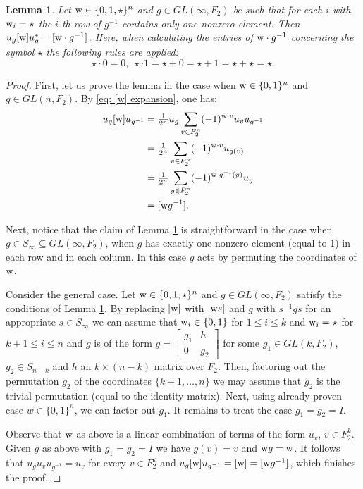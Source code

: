 \documentclass[11pt]{amsart}
\newcommand{\ie}{\text{i.e.\;}}
\theoremstyle{plain}
\newtheorem{lemma}[theorem]{Lemma}
\theoremstyle{definition}
\theoremstyle{remark}
\numberwithin{equation}{section}
\begin{document}
\begin{lemma}\label{lemma: g[w]/g}
	Let ${\rm w}\in\{0,1,\star\}^n$ and $g\in GL(\infty,F_2)$ be such that for each $i$ with ${\rm w}_i=\star$ the $i$-th row of $g^{-1}$ contains only one nonzero element. Then $u_g[{\rm w}]u_g^*=[{\rm w}\cdot g^{-1}]$.  Here, when calculating the entries of ${\rm w}\cdot g^{-1}$ concerning the symbol $\star$ the following rules are applied: $$\star\cdot 0=0,\;\star\cdot 1=\star+0=\star+1=\star+\star=\star.$$
\end{lemma} 
\begin{proof}
	First, let us prove the lemma in the case when ${\rm w}\in\{0,1\}^n$ and $g\in GL(n,F_2)$. By \eqref{eq: [w] expansion}, one has:
	\begin{align*}
		u_g[{\rm w}]u_{g^{-1}}&=\tfrac{1}{2^n}u_g\sum\limits_{v\in F_2^n}(-1)^{{\rm w}\cdot v}u_vu_{g^{-1}}\\&=\tfrac{1}{2^n}\sum\limits_{v\in F_2^n}(-1)^{{\rm w}\cdot v}u_{g(v)}\\&=\tfrac{1}{2^n}\sum\limits_{y\in F_2^n}(-1)^{{\rm w}\cdot g^{-1}(y)}u_y\\&=[{\rm w}g^{-1}].
	\end{align*}
	
	Next, notice that the claim of Lemma \ref{lemma: g[w]/g} is straightforward in the case when $g\in S_\infty\subseteq GL(\infty,F_2)$, \ie when $g$ has exactly one nonzero element (equal to 1) in each row and in each column. In this case $g$ acts by permuting the coordinates of ${\rm w}$.  
	
	Consider the general case. Let ${\rm w}\in\{0,1,\star\}^n$ and $g\in GL(\infty,F_2)$ satisfy the conditions of Lemma \ref{lemma: g[w]/g}. By replacing $[{\rm w}]$ with $[{\rm w}s]$ and $g$ with $s^{-1}gs$ for an appropriate $s\in S_\infty$ we can assume that ${\rm w}_i\in \{0,1\}$ for $1\leqslant i\leqslant k$ and ${\rm w}_i=\star$ for $k+1\leqslant i\leqslant n$ and $g$ is of the form $g=\begin{bmatrix}g_1&h\\0&g_2\end{bmatrix}$ for some $g_1\in GL(k,F_2)$, $g_2\in S_{n-k}$ and $h$ an $k\times (n-k)$ matrix over $F_2$. Then, factoring out the permutation $g_2$ of the coordinates $\{k+1,\ldots,n\}$ we may assume that $g_2$ is the trivial permutation (\ie equal to the identity matrix). Next, using already proven case $w\in\{0,1\}^n$, we can factor out $g_1$. It remains to treat the case $g_1=g_2=I$.
	
	Observe that ${\rm w}$ as above is a linear combination of terms of the form $u_v$, $v\in F_2^k$. Given $g$ as above with $g_1=g_2=I$ we have $g(v)=v$ and ${\rm w}g={\rm w}$. It follows that $u_gu_vu_{g^{-1}}=u_v$ for every $v\in F_2^k$ and $u_g[{\rm w}]u_{g^{-1}}=[{\rm w}]=[{\rm w}g^{-1}]$, which finishes the proof.
\end{proof}
\end{document}
